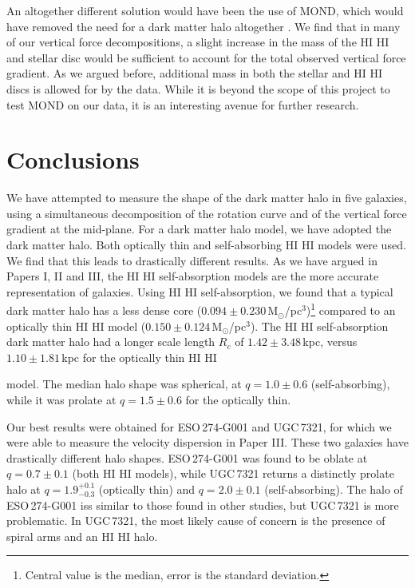 \documentclass[useAMS,usenatbib]{mn2e}
\newcommand{\hi}{%
  \relax
  \ifmmode
    \textrm{\textsc{HI}}
  \else
    \textsc{H{\smaller}I}
  \fi
}
\begin{document}
An altogether different solution would have been the use of MOND, which
 would have removed the need for a dark matter halo altogether 
\citep{Milgrom1983A}.
We find that in many of our vertical force decompositions, a 
slight increase in the mass of the \hi and stellar disc would 
be sufficient to account for the total observed vertical force gradient. 
As we argued before, additional mass in both the stellar and 
\hi discs is allowed for by the data. 
While it is beyond the scope of this project to test MOND on our data, it is 
an interesting avenue for further research.




\section{Conclusions}\label{sec:hydrostaticssummary}
We have attempted to measure the shape of the dark matter halo in five 
galaxies, using a simultaneous decomposition of the
rotation curve and of the vertical force gradient at the mid-plane.
For a dark matter halo model, we have adopted the \citet{Sackett1994A} 
dark matter halo.
Both optically thin and self-absorbing \hi models were used. 
We find that this leads to drastically different results.
As we have argued in Papers I, II and III, the \hi self-absorption models are 
the more accurate representation of galaxies.
Using \hi self-absorption, we found that a typical dark matter halo has 
a less dense core ($0.094\pm0.230$\,M$_\odot$/pc$^3$)\footnote{Central 
value is the median, error is the standard deviation.} compared 
to an optically thin \hi model ($0.150\pm0.124$\,M$_\odot$/pc$^3$).
The \hi self-absorption dark matter halo had a longer scale length $R_c$ of 
$1.42\pm 3.48$\,kpc, versus $1.10\pm 1.81$\,kpc for the optically thin \hi 
model.
The median halo shape was spherical, at $q=1.0\pm0.6$ (self-absorbing), while 
it was prolate at $q=1.5\pm0.6$ for the optically thin.

Our best results were obtained for ESO\,274-G001 and UGC\,7321, for which we 
were able to measure the velocity dispersion in Paper III. 
These two galaxies have drastically different halo shapes.
ESO\,274-G001 was found to be oblate at $q=0.7\pm0.1$ (both 
\hi models), while UGC\,7321 returns a distinctly prolate halo 
at $q=1.9_{-0.3}^{+0.1}$ (optically thin) and $q=2.0\pm0.1$ (self-absorbing). 
The halo of ESO\,274-G001 iss similar to those found in other studies, but 
UGC\,7321 is more problematic. 
In UGC\,7321, the most likely cause of concern is the presence of spiral 
arms and an \hi halo.
\end{document}
